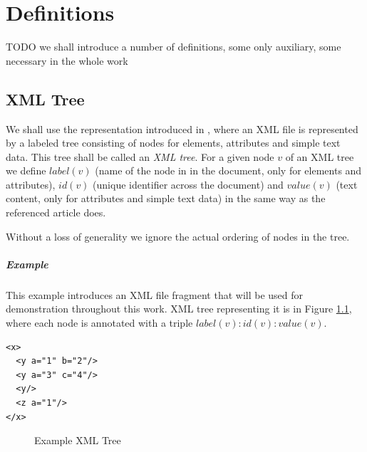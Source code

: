 \chapter{Definitions}

TODO we shall introduce a number of definitions, some only auxiliary, some necessary in the whole work

\section{XML Tree}

We shall use the representation introduced in \cite{fidax}, where an XML file is represented by a labeled tree consisting of nodes for elements, attributes and simple text data. This tree shall be called an \textit{XML tree}. For a given node $v$ of an XML tree we define $label(v)$ (name of the node in in the document, only for elements and attributes), $id(v)$ (unique identifier across the document) and $value(v)$ (text content, only for attributes and simple text data) in the same way as the referenced article does.

Without a loss of generality we ignore the actual ordering of nodes in the tree.

\paragraph{Example}

This example introduces an XML file fragment that will be used for demonstration throughout this work. XML tree representing it is in Figure \ref{image-definitions-example-xml-tree}, where each node is annotated with a triple $label(v) : id(v) : value(v)$.

\begin{verbatim}
<x>
  <y a="1" b="2"/>
  <y a="3" c="4"/>
  <y/>
  <z a="1"/>
</x>
\end{verbatim}

\begin{figure}
  \caption{Example XML Tree}
  \label{image-definitions-example-xml-tree}
  \centering
\end{figure}

